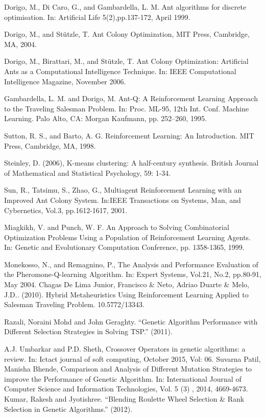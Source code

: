 \documentclass[10pt]{article}
\begin{document}
\begin{thebibliography}{9}
Dorigo, M., Di Caro, G., and Gambardella, L. M. Ant algorithms for discrete optimisation. In: Artificial Life 5(2),pp.137-172, April 1999. 

Dorigo, M., and Stützle, T. Ant Colony Optimization, MIT Press, Cambridge, MA, 2004.

Dorigo,  M.,  Birattari,  M.,  and  Stützle,  T.  Ant Colony  Optimization:  Artificial  Ants  as  a Computational   Intelligence   Technique.  In: IEEE  Computational  Intelligence  Magazine, November 2006.

Gambardella, L. M. and Dorigo, M. Ant-Q: A Reinforcement Learning Approach to the Traveling Salesman Problem. In: Proc. ML-95, 12th Int. Conf. Machine Learning. Palo Alto, CA: Morgan Kaufmann, pp. 252–260, 1995.

Sutton,  R.  S.,  and  Barto,  A.  G. Reinforcement  Learning:  An  Introduction.  MIT  Press, Cambridge, MA, 1998.

Steinley, D. (2006), K-means clustering: A half-century synthesis. British Journal of Mathematical and Statistical Psychology, 59: 1-34.

Sun,  R.,  Tatsimu,  S.,  Zhao,  G.,  Multiagent  Reinforcement  Learning  with  an  Improved Ant  Colony  System.  In:IEEE  Transactions  on  Systems,  Man,  and  Cybernetics,  Vol.3, pp.1612-1617, 2001.

 Miagkikh,  V.  and  Punch,  W.  F.  An  Approach  to  Solving  Combinatorial  Optimization Problems   Using   a   Population   of   Reinforcement   Learning   Agents.   In: Genetic   and Evolutionary Computation Conference, pp. 1358-1365, 1999. 

 Monekosso,  N.,  and  Remagnino,  P.,  The  Analysis  and  Performance  Evaluation  of  the Pheromone-Q-learning Algorithm. In: Expert Systems, Vol.21, No.2, pp.80-91, May 2004. 
Chagas De Lima Junior, Francisco \& Neto, Adriao Duarte \& Melo, J.D.. (2010). Hybrid Metaheuristics Using Reinforcement Learning Applied to Salesman Traveling Problem. 10.5772/13343.


Razali, Noraini Mohd and John Geraghty. “Genetic Algorithm Performance with Different Selection Strategies in Solving TSP.” (2011).

A.J. Umbarkar and P.D. Sheth, Crossover Operators in genetic algorithms: a review. In: Ictact journal of soft computing, October 2015, Vol: 06.
Suvarna Patil, Manisha Bhende, Comparison and Analysis of Different Mutation Strategies to improve the Performance of Genetic Algorithm. In:  International Journal of Computer Science and Information Technologies, Vol. 5 (3) , 2014, 4669-4673.
Kumar, Rakesh and Jyotishree. “Blending Roulette Wheel Selection \& Rank Selection in Genetic Algorithms.” (2012).



\end{thebibliography}
\end{document}
